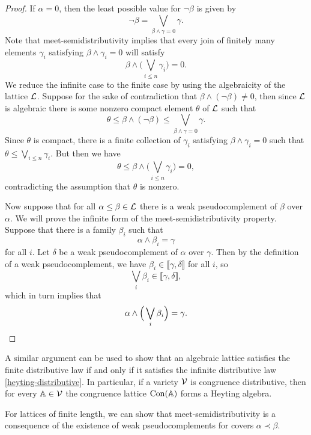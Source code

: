 \begin{appendices}
\begin{proof}
If $\alpha = 0$, then the least possible value for $\neg \beta$ is given by
\[
\neg \beta = \bigvee_{\beta \wedge \gamma = 0} \gamma.
\]
Note that meet-semidistributivity implies that every join of finitely many elements $\gamma_i$ satisfying $\beta \wedge \gamma_i = 0$ will satisfy
\[
\beta \wedge \Big(\bigvee_{i \le n} \gamma_i\Big) = 0.
\]
We reduce the infinite case to the finite case by using the algebraicity of the lattice $\mathcal{L}$. Suppose for the sake of contradiction that $\beta \wedge (\neg \beta) \ne 0$, then since $\mathcal{L}$ is algebraic there is some nonzero compact element $\theta$ of $\mathcal{L}$ such that
\[
\theta \le \beta \wedge (\neg \beta) \le \bigvee_{\beta \wedge \gamma = 0} \gamma.
\]
Since $\theta$ is compact, there is a finite collection of $\gamma_i$ satisfying $\beta \wedge \gamma_i = 0$ such that $\theta \le \bigvee_{i \le n} \gamma_i$. But then we have
\[
\theta \le \beta \wedge \Big(\bigvee_{i \le n} \gamma_i\Big) = 0,
\]
contradicting the assumption that $\theta$ is nonzero.

Now suppose that for all $\alpha \le \beta \in \mathcal{L}$ there is a weak pseudocomplement of $\beta$ over $\alpha$. We will prove the infinite form of the meet-semidistributivity property. Suppose that there is a family $\beta_i$ such that
\[
\alpha \wedge \beta_i = \gamma
\]
for all $i$. Let $\delta$ be a weak pseudocomplement of $\alpha$ over $\gamma$. Then by the definition of a weak pseudocomplement, we have $\beta_i \in \llbracket \gamma, \delta \rrbracket$ for all $i$, so
\[
\bigvee_i \beta_i \in \llbracket \gamma, \delta \rrbracket,
\]
which in turn implies that
\[
\alpha \wedge \Big(\bigvee_i \beta_i\Big) = \gamma.\qedhere
\]
\end{proof}

\begin{rem} A similar argument can be used to show that an algebraic lattice satisfies the finite distributive law if and only if it satisfies the infinite distributive law \eqref{heyting-distributive}. In particular, if a variety $\mathcal{V}$ is congruence distributive, then for every $\mathbb{A} \in \mathcal{V}$ the congruence lattice $\operatorname{Con}(\mathbb{A})$ forms a Heyting algebra.
\end{rem}


For lattices of finite length, we can show that meet-semidistributivity is a consequence of the existence of weak pseudocomplements for covers $\alpha \prec \beta$.


\end{appendices}
